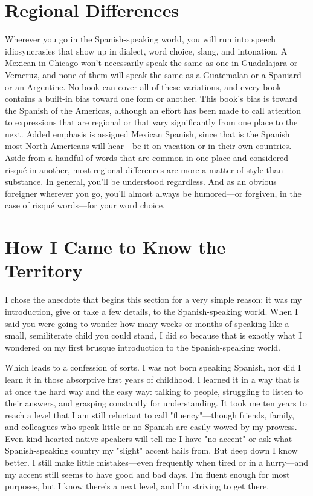 \section{Regional Differences}

Wherever you go in the Spanish-speaking world, you will run
into speech idiosyncrasies that show up in dialect, word choice, slang,
and intonation. A Mexican in Chicago won't necessarily speak the
same as one in Guadalajara or Veracruz, and none of them will speak
the same as a Guatemalan or a Spaniard or an Argentine. No book can
cover all of these variations, and every book contains a built-in bias
toward one form or another. This book's bias is toward the Spanish of
the Americas, although an effort has been made to call attention to
expressions that are regional or that vary significantly from one place to
the next. Added emphasis is assigned Mexican Spanish, since that is
the Spanish most North Americans will hear---be it on vacation or in
their own countries. Aside from a handful of words that are common
in one place and considered risqué in another, most regional differences are more a matter of style than substance. In general, you'll be
understood regardless. And as an obvious foreigner wherever you go,
you'll almost always be humored---or forgiven, in the case of risqué
words---for your word choice.

\section{How I Came to Know the Territory}

I chose the anecdote that begins this section for a very simple
reason: it was my introduction, give or take a few details, to the
Spanish-speaking world. When I said you were going to wonder how
many weeks or months of speaking like a small, semiliterate child
you could stand, I did so because that is exactly what I wondered on
my first brusque introduction to the Spanish-speaking world.

Which leads to a confession of sorts. I was not born speaking
Spanish, nor did I learn it in those absorptive first years of childhood. I
learned it in a way that is at once the hard way and the easy way: talking to people, struggling to listen to their answers, and grasping constantly for understanding. It took me ten years to reach a level that I
am still reluctant to call "fluency"---though friends, family, and colleagues who speak little or no Spanish are easily wowed by my prowess. Even kind-hearted native-speakers will tell me I have "no accent"
or ask what Spanish-speaking country my "slight" accent hails from.
But deep down I know better. I still make little mistakes---even frequently when tired or in a hurry---and my accent still seems to have
good and bad days. I'm fluent enough for most purposes, but I know
there's a next level, and I'm striving to get there.

